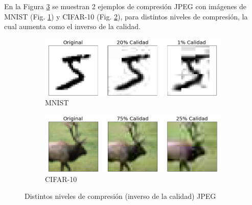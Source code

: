 En la Figura \ref{cal_JPEG} se muestran 2 ejemplos de compresión JPEG con imágenes de MNIST (Fig. \ref{jpeg_cal_mnist}) y CIFAR-10 (Fig. \ref{jpeg_cal_cifar}), para distintos niveles de compresión, la cual aumenta como el inverso de la calidad.

\begin{figure}[h]
    \centering
    \begin{subfigure}[b]{0.48\textwidth}
        \centering
        \includegraphics[width=\textwidth]{images/mnist/jpeg_qual_mnist.png}
        \caption{MNIST}
        \label{jpeg_cal_mnist}
    \end{subfigure}
    \hfill
    \begin{subfigure}[b]{0.48\textwidth}
        \centering
        \includegraphics[width=\textwidth]{images/cifar-10/jpeg_qual_cifar.png}
        \caption{CIFAR-10}
        \label{jpeg_cal_cifar}
    \end{subfigure}
    \caption{Distintos niveles de compresión (inverso de la calidad) JPEG}
    \label{cal_JPEG}
\end{figure}